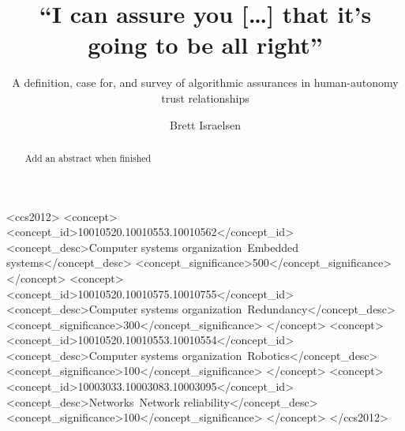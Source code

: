\documentclass[manuscript, review, screen]{acmart}
\begin{document}
\title{``I can assure you [\ldots] that it's going to be all right''} 
 \subtitle{A definition, case for, and survey of algorithmic assurances in human-autonomy trust relationships}
\author{Brett Israelsen}

\begin{abstract}
    Add an abstract when finished
\end{abstract}


%
%
\begin{CCSXML}
<ccs2012>
 <concept>
  <concept_id>10010520.10010553.10010562</concept_id>
  <concept_desc>Computer systems organization~Embedded systems</concept_desc>
  <concept_significance>500</concept_significance>
 </concept>
 <concept>
  <concept_id>10010520.10010575.10010755</concept_id>
  <concept_desc>Computer systems organization~Redundancy</concept_desc>
  <concept_significance>300</concept_significance>
 </concept>
 <concept>
  <concept_id>10010520.10010553.10010554</concept_id>
  <concept_desc>Computer systems organization~Robotics</concept_desc>
  <concept_significance>100</concept_significance>
 </concept>
 <concept>
  <concept_id>10003033.10003083.10003095</concept_id>
  <concept_desc>Networks~Network reliability</concept_desc>
  <concept_significance>100</concept_significance>
 </concept>
</ccs2012>  
\end{CCSXML}


%
%

\end{document}
